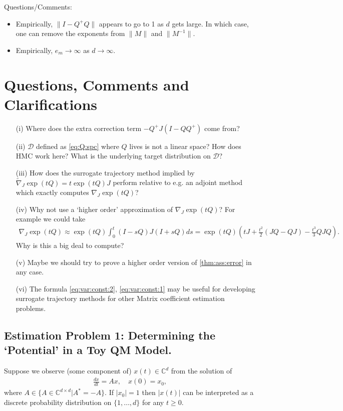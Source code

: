 \documentclass[twoside]{article}
\numberwithin{equation}{section}
\newcommand{\CC}{\mathbb{C}}
\begin{document}
Questions/Comments:
\begin{itemize}
	\item Empirically, $\lVert I-Q^+Q\rVert$ appears to go to 1 as $d$ gets large.   In which case, one can remove the exponents from $\lVert M \rVert$ and $\lVert M^{-1} \rVert$.
	\item Empirically, $e_m \rightarrow \infty$ as $d \rightarrow \infty$.
\end{itemize}

\section{Questions, Comments and Clarifications}

\begin{itemize}
\item[(i)] Where does the extra correction term $-Q^+ J (I- Q Q^+)$ come from?
\item[(ii)] $\mathcal{D}$ defined as \eqref{eq:Q:spc} where $Q$ lives is not a linear space?  How does HMC work here?  What is the underlying target distribution on $\mathcal{D}$?
\item[(iii)] How does the surrogate trajectory method implied by $\tilde{\nabla}_J \exp(t Q) = t  \exp(t Q) J$ perform relative to 
e.g. an adjoint method which exactly computes $\nabla_J \exp(t Q)$?
\item[(iv)] Why not use a `higher order' approximation of $\nabla_J \exp(t Q)$?  For example we could take
\begin{align}
	\nabla_J \exp(t Q) \approx \exp(t Q) \int_0^t (I - sQ) J (I + sQ)ds = \exp(tQ) \left(tJ + \frac{t^2}{2} (JQ - QJ) -\frac{t^3}{3} QJ Q\right).
\end{align}
Why is this a big deal to compute?
\item[(v)] Maybe we should try to prove a higher order version of \eqref{thm:ass:error} in any case.
\item[(vi)] The formula \eqref{eq:var:const:2}, \eqref{eq:var:const:1} may be useful for developing surrogate trajectory methods for other Matrix coefficient estimation problems.
\end{itemize}

\subsection{Estimation Problem 1: Determining the `Potential' in a Toy QM Model.}

Suppose we observe (some component of) $x(t) \in \CC^d$ from the solution of
\begin{align}
	\frac{d x}{dt} = A x, \quad x(0) = x_0,
\end{align}
where $A \in \{ A \in \CC^{d\times d} | A^* = -A\}$.  If $|x_0| =1$ then $|x(t)|$  can be interpreted as a discrete probability distribution on $\{1, \ldots, d\}$ for any $t \geq 0$.
\end{document}
